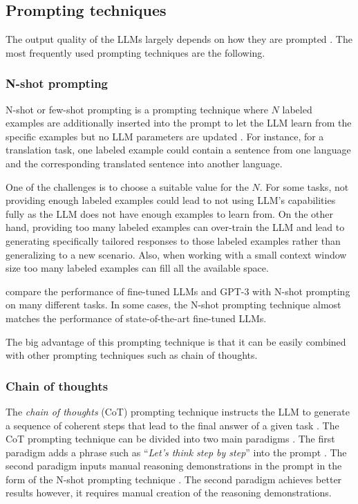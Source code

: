 \subsection{Prompting techniques}

The output quality of the LLMs largely depends on how they are prompted \cite{Brown2020,Wei2022}. The most frequently used prompting techniques are the following.


\subsubsection{N-shot prompting}

N-shot or few-shot prompting is a prompting technique where $N$ labeled examples are additionally inserted into the prompt to let the LLM learn from the specific examples but no LLM parameters are updated \cite{Brown2020}. For instance, for a translation task, one labeled example could contain a sentence from one language and the corresponding translated sentence into another language.

One of the challenges is to choose a suitable value for the $N$. For some tasks, not providing enough labeled examples could lead to not using LLM's capabilities fully as the LLM does not have enough examples to learn from. On the other hand, providing too many labeled examples can over-train the LLM and lead to generating specifically tailored responses to those labeled examples rather than generalizing to a new scenario. Also, when working with a small context window size too many labeled examples can fill all the available space.

\citet{Brown2020} compare the performance of fine-tuned LLMs and GPT-3 with N-shot prompting on many different tasks. In some cases, the N-shot prompting technique almost matches the performance of state-of-the-art fine-tuned LLMs.

The big advantage of this prompting technique is that it can be easily combined with other prompting techniques such as chain of thoughts.


\subsubsection{Chain of thoughts}
\label{sec:chain_of_thoughts}

The \emph{chain of thoughts} (CoT) prompting technique instructs the LLM to generate a sequence of coherent steps that lead to the final answer of a given task \cite{Wei2022}. The CoT prompting technique can be divided into two main paradigms \cite{Zhang2022}. The first paradigm adds a phrase such as ``\textit{Let's think step by step}'' into the prompt \cite{Kojima2022}. The second paradigm inputs manual reasoning demonstrations in the prompt in the form of the N-shot prompting technique \cite{Wei2022}. 
The second paradigm achieves better results \cite{Wei2022} however, it requires manual creation of the reasoning demonstrations.

